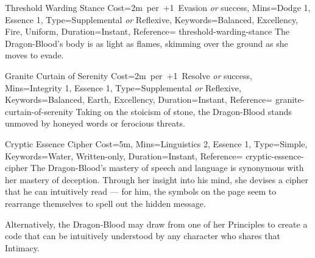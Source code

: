 

\begin{Charm}{Threshold Warding Stance}{%
    Cost=2m~per~+1~Evasion \emph{or} success,
    Mins={Dodge 1, Essence 1},
    Type=Supplemental \emph{or} Reflexive,
    Keywords={Balanced, Excellency, Fire, Uniform},
    Duration=Instant,
    Reference=\cite*[p.~190]{db}
}{threshold-warding-stance}
    The Dragon-Blood's body is as light as flames, skimming over the ground as
    she moves to evade. 
\end{Charm}




\begin{Charm}{Granite Curtain of Serenity}{%
    Cost=2m~per~+1~Resolve \emph{or} success,
    Mins={Integrity 1, Essence 1},
    Type=Supplemental \emph{or} Reflexive,
    Keywords={Balanced, Earth, Excellency},
    Duration=Instant,
    Reference=\cite*[p.~194]{db}
}{granite-curtain-of-serenity}
    Taking on the stoicism of stone, the Dragon-Blood stands unmoved by honeyed
    words or ferocious threats. 
\end{Charm}




\begin{Charm}{Cryptic Essence Cipher}{%
    Cost=5m,
    Mins={Linguistics 2, Essence 1},
    Type=Simple,
    Keywords={Water, Written-only},
    Duration=Instant,
    Reference=\cite*[p.~209]{db}
}{cryptic-essence-cipher}
    The Dragon-Blood's mastery of speech and language is synonymous with her
    mastery of deception.  Through her insight
    into his mind, she devises a cipher that he can intuitively read --- for
    him, the symbols on the page seem to rearrange themselves to spell out the
    hidden message. 

    Alternatively, the Dragon-Blood may draw from one of her Principles to
    create a code that can be intuitively understood by any character who
    shares that Intimacy.
\end{Charm}



